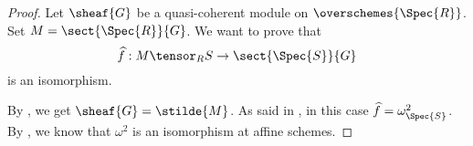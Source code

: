 \begin{proof}
Let $\sheaf{G}$ be a quasi-coherent module on $\overschemes{\Spec{R}}$.
Set $M = \sect{\Spec{R}}{G}$.
We want to prove that 
\[
\widehat{f}:M \tensor_{R} S \rightarrow \sect{\Spec{S}}{G}
\]
is an isomorphism.

By , we get $\sheaf{G} = \stilde{M}$.
As said in , in this case $\widehat{f} = \omega^2_{\Spec{S}}$.
By , we know that $\omega^2$ is an isomorphism at affine schemes.
\end{proof}
